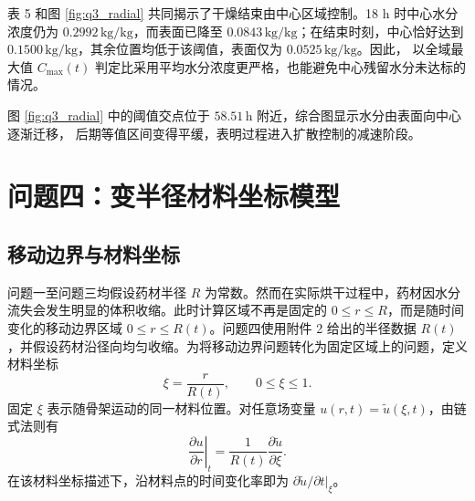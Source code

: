 \documentclass[withoutpreface,bwprint]{cumcm_thesis}
\begin{document}
表 5 和图 \ref{fig:q3_radial} 共同揭示了干燥结束由中心区域控制。18 h 时中心水分浓度仍为
\(0.2992\,\mathrm{kg/kg}\)，而表面已降至 \(0.0843\,\mathrm{kg/kg}\)；在结束时刻，中心恰好达到
\(0.1500\,\mathrm{kg/kg}\)，其余位置均低于该阈值，表面仅为 \(0.0525\,\mathrm{kg/kg}\)。因此，
以全域最大值 \(C_{\max}(t)\) 判定比采用平均水分浓度更严格，也能避免中心残留水分未达标的情况。

图 \ref{fig:q3_radial} 中的阈值交点位于 \(58.51\,\mathrm{h}\) 附近，综合图显示水分由表面向中心逐渐迁移，
后期等值区间变得平缓，表明过程进入扩散控制的减速阶段。




























\section{问题四：变半径材料坐标模型}

\subsection{移动边界与材料坐标}

问题一至问题三均假设药材半径 \(R\) 为常数。然而在实际烘干过程中，药材因水分流失会发生明显的体积收缩。此时计算区域不再是固定的 \(0 \le r \le R\)，而是随时间变化的移动边界区域 \(0 \le r \le R(t)\)。问题四使用附件 2 给出的半径数据 \(R(t)\)，并假设药材沿径向均匀收缩。为将移动边界问题转化为固定区域上的问题，定义材料坐标
\begin{equation}
\xi = \frac{r}{R(t)}, \qquad 0 \le \xi \le 1.
\end{equation}
固定 \(\xi\) 表示随骨架运动的同一材料位置。对任意场变量 \(u(r,t) = \tilde{u}(\xi,t)\)，由链式法则有
\begin{equation}
\left.\frac{\partial u}{\partial r}\right|_t = \frac{1}{R(t)}\frac{\partial \tilde{u}}{\partial \xi}.
\end{equation}
在该材料坐标描述下，沿材料点的时间变化率即为 \(\partial \tilde{u}/\partial t|_{\xi}\)。
\end{document}

